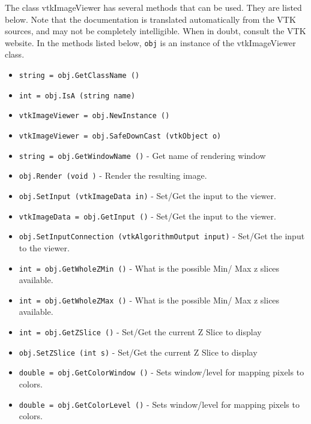 The class vtkImageViewer has several methods that can be used.
  They are listed below.
Note that the documentation is translated automatically from the VTK sources,
and may not be completely intelligible.  When in doubt, consult the VTK website.
In the methods listed below, \verb|obj| is an instance of the vtkImageViewer class.
\begin{itemize}
\item  \verb|string = obj.GetClassName ()|

\item  \verb|int = obj.IsA (string name)|

\item  \verb|vtkImageViewer = obj.NewInstance ()|

\item  \verb|vtkImageViewer = obj.SafeDownCast (vtkObject o)|

\item  \verb|string = obj.GetWindowName ()| -  Get name of rendering window

\item  \verb|obj.Render (void )| -  Render the resulting image.

\item  \verb|obj.SetInput (vtkImageData in)| -  Set/Get the input to the viewer.

\item  \verb|vtkImageData = obj.GetInput ()| -  Set/Get the input to the viewer.

\item  \verb|obj.SetInputConnection (vtkAlgorithmOutput input)| -  Set/Get the input to the viewer.

\item  \verb|int = obj.GetWholeZMin ()| -  What is the possible Min/ Max z slices available.

\item  \verb|int = obj.GetWholeZMax ()| -  What is the possible Min/ Max z slices available.

\item  \verb|int = obj.GetZSlice ()| -  Set/Get the current Z Slice to display

\item  \verb|obj.SetZSlice (int s)| -  Set/Get the current Z Slice to display

\item  \verb|double = obj.GetColorWindow ()| -  Sets window/level for mapping pixels to colors.

\item  \verb|double = obj.GetColorLevel ()| -  Sets window/level for mapping pixels to colors.


\end{itemize}
